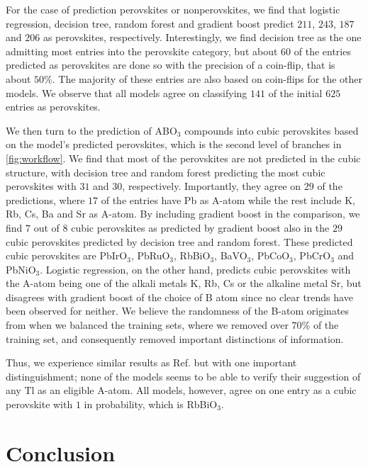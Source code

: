 For the case of prediction perovskites or nonperovskites, we find that logistic regression, decision tree, random forest and gradient boost predict $211$, $243$, $187$ and $206$ as perovskites, respectively. Interestingly, we find decision tree as the one admitting most entries into the perovskite category, but about $60$ of the entries predicted as perovskites are done so with the precision of a coin-flip, that is about $50\%$. The majority of these entries are also based on coin-flips for the other models. We observe that all models agree on classifying $141$ of the initial $625$ entries as perovskites.

We then turn to the prediction of ABO$_3$ compounds into cubic perovskites based on the model's predicted perovskites, which is the second level of branches in \autoref{fig:workflow}. We find that most of the perovskites are not predicted in the cubic structure, with decision tree and random forest predicting the most cubic perovskites with $31$ and $30$, respectively. Importantly, they agree on $29$ of the predictions, where $17$ of the entries have Pb as A-atom while the rest include K, Rb, Cs, Ba and Sr as A-atom. By including gradient boost in the comparison, we find $7$ out of $8$ cubic perovskites as predicted by gradient boost also in the $29$ cubic perovskites predicted by decision tree and random forest. These predicted cubic perovskites are PbIrO$_3$, PbRuO$_3$, RbBiO$_3$, BaVO$_3$, PbCoO$_3$, PbCrO$_3$ and PbNiO$_3$. Logistic regression, on the other hand, predicts cubic perovskites with the A-atom being one of the alkali metals K, Rb, Cs or the alkaline metal Sr, but disagrees with gradient boost of the choice of B atom since no clear trends have been observed for neither. We believe the randomness of the B-atom originates from when we balanced the training sets, where we removed over $70\%$ of the training set, and consequently removed important distinctions of information.

Thus, we experience similar results as Ref. \cite{Balachandran2018} but with one important distinguishment; none of the models seems to be able to verify their suggestion of any Tl as an eligible A-atom. All models, however, agree on one entry as a cubic perovskite with $1$ in probability, which is RbBiO$_3$.

\section{Conclusion}

